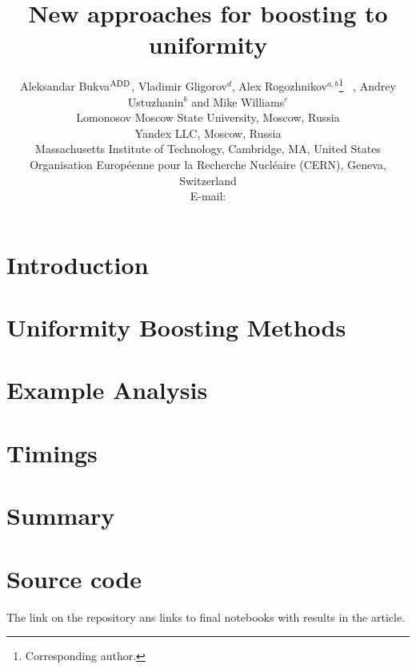 \documentclass{JINST}
\title{New approaches for boosting to uniformity}
\author{
Aleksandar Bukva$^{\rm ADD}$, 
Vladimir Gligorov$^d$,
Alex Rogozhnikov$^{a,b}$\thanks{Corresponding author.}~ ,
Andrey Ustuzhanin$^b$ and
Mike Williams$^c$\\
\llap{$^a$}Lomonosov Moscow State University, Moscow, Russia\\
\llap{$^b$}Yandex LLC, Moscow, Russia\\
\llap{$^c$}Massachusetts Institute of Technology, Cambridge, MA, United States \\
\llap{$^d$}Organisation Europ\'eenne pour la Recherche Nucl\'eaire (CERN), Geneva, Switzerland  \\
E-mail: \email{alex.rogozhnikov@yandex.ru}}
\theoremstyle{definition}
\theoremstyle{remark}
\begin{document}
\maketitle


\section{Introduction}






\section{Uniformity Boosting Methods}


\section{Example Analysis}




\section{Timings}



\section{Summary}



\section{Source code}


The link on the repository ans links to final notebooks with results in the article.

\acknowledgments
\end{document}

